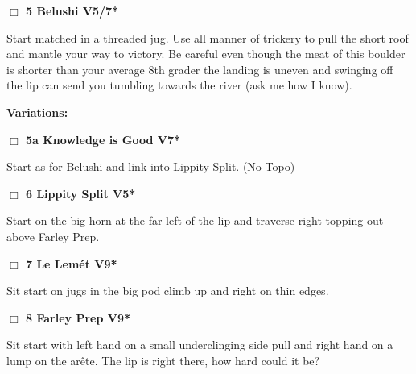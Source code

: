 	\begin{multicols}{2}


\needspace{1.5cm}
\label{rt:Belushi}
\colorbox{RoyalBlue!20}{
\parbox{0.95\linewidth}{
\hspace{-1ex}\textbf{$\Box$
5 Belushi V5/7*  \warn
}}}
\begin{adjustwidth}{1.3em}{}			
Start matched in a threaded jug. Use all manner of trickery to pull the short roof and mantle your way to victory. Be careful even though the meat of this boulder is shorter than your average 8th grader the landing is uneven and swinging off the lip can send you tumbling towards the river (ask me how I know).
\end{adjustwidth}


\begin{adjustwidth}{0.5cm}{}				
\needspace{3cm}
\textbf{Variations:} \newline

\needspace{1.5cm}
\label{vr:Knowledge is Good}
\colorbox{Goldenrod!20}{
\parbox{0.95\linewidth}{
\hspace{-1ex}\textbf{$\Box$
5a Knowledge is Good V7*  
}}}
\begin{adjustwidth}{1.3em}{}			
Start as for Belushi and link into Lippity Split.
  (No Topo)
\end{adjustwidth}



\end{adjustwidth}


\needspace{1.5cm}
\label{rt:Lippity Split}
\colorbox{RoyalBlue!20}{
\parbox{0.95\linewidth}{
\hspace{-1ex}\textbf{$\Box$
6 Lippity Split V5*  
}}}
\begin{adjustwidth}{1.3em}{}			
Start on the big horn at the far left of the lip and traverse right topping out above Farley Prep.
\end{adjustwidth}




\needspace{1.5cm}
\label{rt:Le Lemét}
\colorbox{Goldenrod!20}{
\parbox{0.95\linewidth}{
\hspace{-1ex}\textbf{$\Box$
7 Le Lemét V9*  
}}}
\begin{adjustwidth}{1.3em}{}			
Sit start on jugs in the big pod climb up and right on thin edges.
\end{adjustwidth}




\needspace{1.5cm}
\label{rt:Farley Prep}
\colorbox{Goldenrod!20}{
\parbox{0.95\linewidth}{
\hspace{-1ex}\textbf{$\Box$
8 Farley Prep V9*  
}}}
\begin{adjustwidth}{1.3em}{}			
Sit start with left hand on a small underclinging side pull and right hand on a lump on the arête. The lip is right there, how hard could it be?
\end{adjustwidth}






\end{multicols}
\clearpage